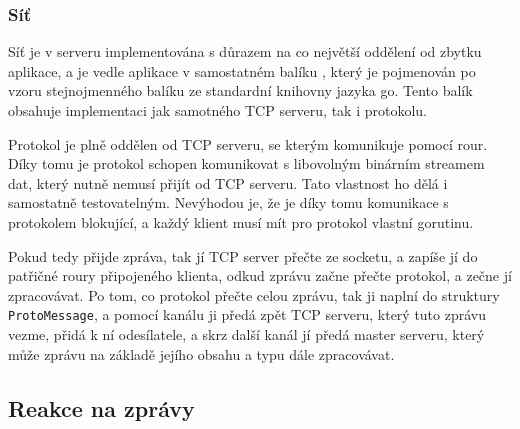 \documentclass[12pt, a4paper]{article}
\begin{document}
    \subsubsection{Síť}
    Síť je v serveru implementována s důrazem na co největší oddělení od zbytku aplikace, a je vedle aplikace v samostatném balíku , který je pojmenován po vzoru stejnojmenného balíku ze standardní knihovny jazyka go.
    Tento balík obsahuje implementaci jak samotného TCP serveru, tak i protokolu.
    
    Protokol je plně oddělen od TCP serveru, se kterým komunikuje pomocí rour.
    Díky tomu je protokol schopen komunikovat s libovolným binárním streamem dat, který nutně nemusí přijít od TCP serveru.
    Tato vlastnost ho dělá i samostatně testovatelným.
    Nevýhodou je, že je díky tomu komunikace s protokolem blokující, a každý klient musí mít pro protokol vlastní gorutinu.

    Pokud tedy přijde zpráva, tak jí TCP server přečte ze socketu, a zapíše jí do patřičné roury připojeného klienta, odkud zprávu začne přečte protokol, a zečne jí zpracovávat.
    Po tom, co protokol přečte celou zprávu, tak ji naplní do struktury \texttt{ProtoMessage}, a pomocí kanálu ji předá zpět TCP serveru, který tuto zprávu vezme, přidá k ní odesílatele, a skrz další kanál jí předá master serveru, který může zprávu na základě jejího obsahu a typu dále zpracovávat.

    \subsection{Reakce na zprávy}
\end{document}
